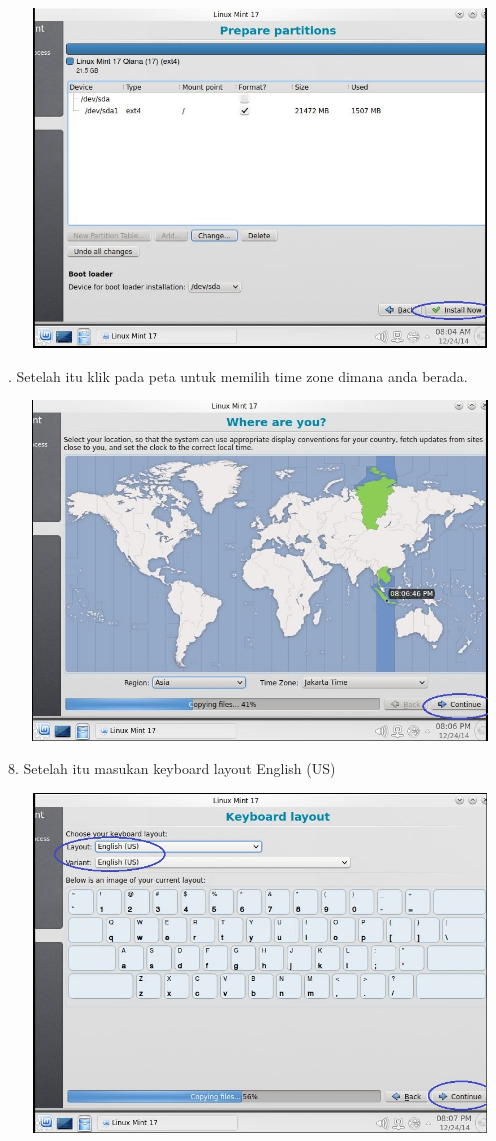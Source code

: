 \documentclass[11pt,fleqn]{book} %
\begin{document}
\begin{center}
\includegraphics[width=14cm,height=9cm]{Capture8.JPG}\\
\end{center}
. Setelah itu klik pada peta untuk memilih time zone dimana anda berada.
\begin{center}
\includegraphics[width=14cm,height=9cm]{Capture9.JPG}\\
\end{center}
8. Setelah itu masukan keyboard layout English (US)
\begin{center}
\includegraphics[width=14cm,height=9cm]{Capture10.JPG}\\
\end{center}
\end{document}
